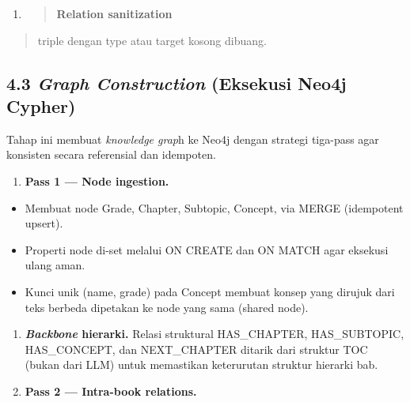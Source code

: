 \documentclass[
]{article}
\begin{document}
\begin{enumerate}
\def\labelenumi{\arabic{enumi}.}
\setcounter{enumi}{9}
\item
  \begin{quote}
  \textbf{Relation sanitization}
  \end{quote}
\end{enumerate}

\begin{quote}
triple dengan type atau target kosong dibuang.
\end{quote}

\hypertarget{graph-construction-eksekusi-neo4j-cypher}{%
\subsection{\texorpdfstring{4.3 \emph{Graph Construction} (Eksekusi
Neo4j
Cypher)}{4.3 Graph Construction (Eksekusi Neo4j Cypher)}}\label{graph-construction-eksekusi-neo4j-cypher}}

Tahap ini membuat \emph{knowledge grap}h ke Neo4j dengan strategi
tiga-pass agar konsisten secara referensial dan idempoten.

\begin{enumerate}
\def\labelenumi{\arabic{enumi}.}
\item
  \textbf{Pass 1 --- Node ingestion.}
\end{enumerate}

\begin{itemize}
\item
  Membuat node Grade, Chapter, Subtopic, Concept, via MERGE (idempotent
  upsert).
\item
  Properti node di-set melalui ON CREATE dan ON MATCH agar eksekusi
  ulang aman.
\item
  Kunci unik (name, grade) pada Concept membuat konsep yang dirujuk dari
  teks berbeda dipetakan ke node yang sama (shared node).
\end{itemize}

\begin{enumerate}
\def\labelenumi{\arabic{enumi}.}
\setcounter{enumi}{1}
\item
  \textbf{\emph{Backbone} hierarki.} Relasi struktural HAS\_CHAPTER,
  HAS\_SUBTOPIC, HAS\_CONCEPT, dan NEXT\_CHAPTER ditarik dari struktur
  TOC (bukan dari LLM) untuk memastikan keterurutan struktur hierarki
  bab.
\item
  \textbf{Pass 2 --- Intra-book relations.}
\end{enumerate}
\end{document}
